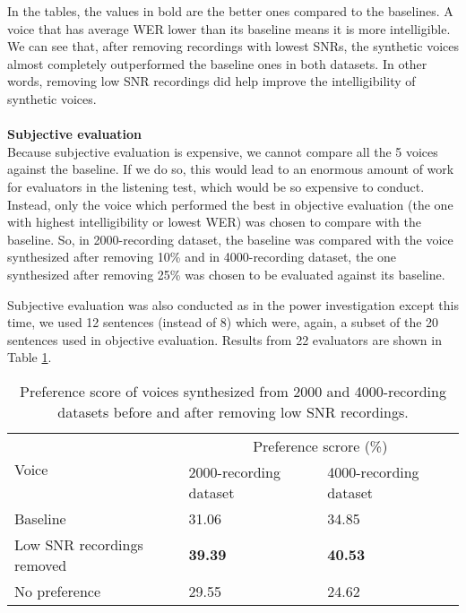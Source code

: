\documentclass[12pt]{article}
\begin{document}
In the tables, the values in bold are the better ones compared to the baselines. A voice that has average WER lower than its baseline means it is more intelligible. We can see that, after removing recordings with lowest SNRs, the synthetic voices almost completely outperformed the baseline ones in both datasets. In other words, removing low SNR recordings did help improve the intelligibility of synthetic voices.\\\\
\textbf{Subjective evaluation}
\vspace{0.28cm}\\
Because subjective evaluation is expensive, we cannot compare all the 5 voices against the baseline. If we do so, this would lead to an enormous amount of work for evaluators in the listening test, which would be so expensive to conduct. Instead, only the voice which performed the best in objective evaluation (the one with highest intelligibility or lowest WER) was chosen to compare with the baseline. So, in 2000-recording dataset, the baseline was compared with the voice synthesized after removing 10\% and in 4000-recording dataset, the one synthesized after removing 25\% was chosen to be evaluated against its baseline.

Subjective evaluation was also conducted as in the power investigation except this time, we used 12 sentences (instead of 8) which were, again, a subset of the 20 sentences used in objective evaluation. Results from 22 evaluators are shown in Table \ref{tab_subEvaSnr}.

\begin{table}[]
\begin{center}
\caption{Preference score of voices synthesized from 2000 and 4000-recording datasets before and after removing low SNR recordings.}
\label{tab_subEvaSnr}
\vspace{3mm}
\begin{tabular}{|l|m{2.8cm}|m{2.8cm}|}
\hline
\multirow{2}{4cm}{Voice} &
\multicolumn{2}{c|}{Preference scrore (\%)} \\ \cline{2-3}
& 2000-recording dataset & 4000-recording dataset \\
\hline
Baseline                   & 31.06          & 34.85 \\
Low SNR recordings removed & \textbf{39.39} & \textbf{40.53} \\
No preference              & 29.55          & 24.62 \\
\hline
\end{tabular}
\end{center}
\end{table}
\end{document}
